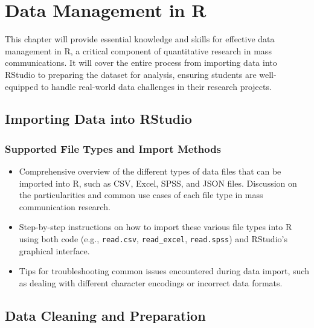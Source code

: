 \documentclass[
]{book}
\begin{document}
\hypertarget{data-management-in-r}{%
\chapter*{Data Management in R}\label{data-management-in-r}}

This chapter will provide essential knowledge and skills for effective data management in R, a critical component of quantitative research in mass communications. It will cover the entire process from importing data into RStudio to preparing the dataset for analysis, ensuring students are well-equipped to handle real-world data challenges in their research projects.

\hypertarget{importing-data-into-rstudio}{%
\section*{Importing Data into RStudio}\label{importing-data-into-rstudio}}

\hypertarget{supported-file-types-and-import-methods}{%
\subsection*{Supported File Types and Import Methods}\label{supported-file-types-and-import-methods}}

\begin{itemize}
\item
  Comprehensive overview of the different types of data files that can be imported into R, such as CSV, Excel, SPSS, and JSON files. Discussion on the particularities and common use cases of each file type in mass communication research.
\item
  Step-by-step instructions on how to import these various file types into R using both code (e.g., \texttt{read.csv}, \texttt{read\_excel}, \texttt{read.spss}) and RStudio's graphical interface.
\item
  Tips for troubleshooting common issues encountered during data import, such as dealing with different character encodings or incorrect data formats.
\end{itemize}

\hypertarget{data-cleaning-and-preparation}{%
\section*{Data Cleaning and Preparation}\label{data-cleaning-and-preparation}}
\end{document}
